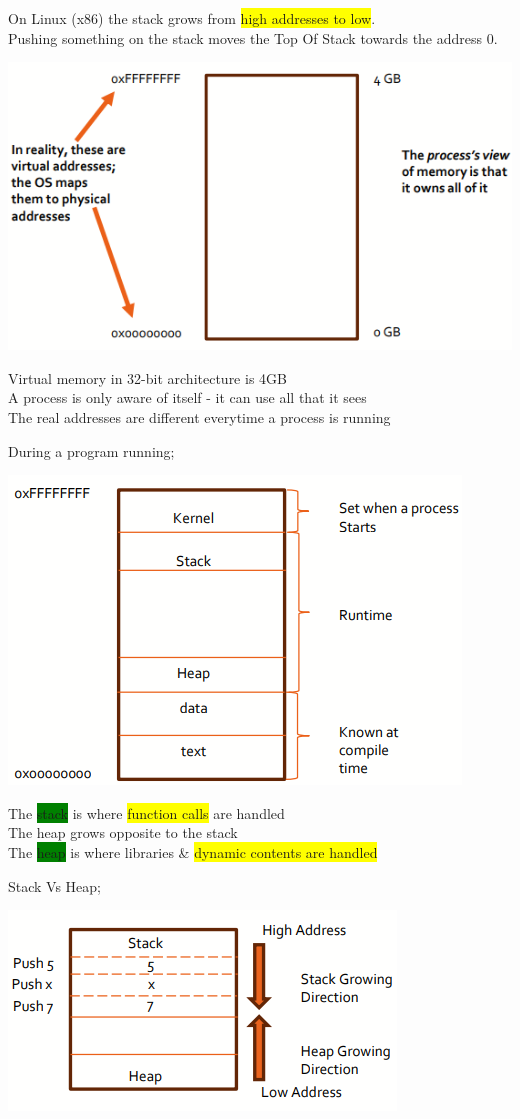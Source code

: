 \documentclass[]{project_plan}
\begin{document}
On Linux (x86) the stack grows from \colorbox{yellow}{high addresses to low}.\\
Pushing something on the stack moves the Top Of Stack towards the address 0.

\includegraphics[width=.6\linewidth]{lec6 callStack.png}

Virtual memory in 32-bit architecture is 4GB\\
A process is only aware of itself - it can use all that it sees\\
The real addresses are different everytime a process is running

During a program running;

\includegraphics[width=.6\linewidth]{lec6 callStack program running.png}

The \colorbox{green}{stack} is where \colorbox{yellow}{function calls} are handled\\
The heap grows opposite to the stack\\
The \colorbox{green}{heap} is where libraries \& \colorbox{yellow}{dynamic contents are handled}

Stack Vs Heap;

\includegraphics[width=.6\linewidth]{stack vs heap.png}
\end{document}
